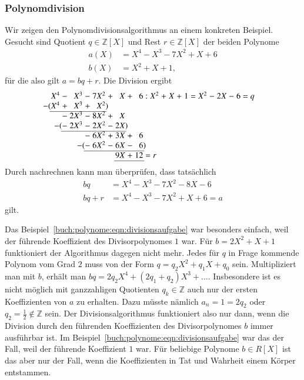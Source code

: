 \subsubsection{Polynomdivision}
Wir zeigen den Polynomdivisionsalgorithmus an einem konkreten Beispiel.
Gesucht sind Quotient $q\in \mathbb{Z}[X]$ und Rest $r\in\mathbb{Z}[X]$
der beiden Polynome
\begin{equation}
\begin{aligned}
a(X) &= X^4 - X^3 -7X^2 + X + 6\\
b(X) &= X^2+X+1,
\end{aligned}
\label{buch:polynome:eqn:divisionsaufgabe}
\end{equation}
für die also gilt $a=bq+r$.
Die Division ergibt
\[
\arraycolsep=1.4pt
\begin{array}{rcrcrcrcrcrcrcrcrcrcr}
X^4&-& X^3&-&7X^2&+& X&+&6&:&X^2&+&X&+&1&=&X^2&-&2X&-&6=q\\
\llap{$-($}X^4&+& X^3&+& X^2\rlap{$)$}& &  & & & &   & & & & & &   & &  & & \\ \cline{1-5}
   &-&2X^3&-&8X^2&+& X& & & &   & & & & & &   & &  & & \\
   &\llap{$-($}-&2X^3&-&2X^2&-&2X\rlap{$)$}& & & &   & & & & & &   & &  & & \\ \cline{2-7}
   & &    &-&6X^2&+&3X&+&6& &   & & & & & &   & &  & & \\
   & &    &\llap{$-($}-&6X^2&-&6X&-&6\rlap{$)$}& &   & & & & & &   & &  & & \\ \cline{4-9}
   & &    & &    & &9X&+&12\rlap{$\mathstrut=r$}& &   & & & & & &   & &  & & \\ \cline{7-9}
\end{array}
\]
Durch nachrechnen kann man überprüfen, dass tatsächlich
\begin{align*}
bq
&=
X^4-X^3-7X^2-8X-6
\\
bq+r&=
X^4-X^3-7X^2+X+6 = a
\end{align*}
gilt.

Das Beispiel~\eqref{buch:polynome:eqn:divisionsaufgabe} war besonders
einfach, weil der führende Koeffizient des Divisorpolynomes $1$ war.
Für $b=2X^2+X+1$ funktioniert der Algorithmus dagegen nicht mehr.
Jedes für $q$ in Frage kommende Polynom vom Grad $2$ muss von der
Form $q=q_2X^2+q_1X+q_0$ sein.
Multipliziert man mit $b$, erhält man $bq=2q_2X^4 + (2q_1+q_2)X^3+\dots$.
Insbesondere ist es nicht möglich mit ganzzahligen Quotienten
$q_k\in\mathbb{Z}$ auch nur der ersten Koeffizienten von $a$ zu
erhalten.
Dazu müsste nämlich $a_n = 1 = 2q_2$ oder $q_2 = \frac12\not\in\mathbb{Z}$
sein.
Der Divisionsalgorithmus funktioniert also nur dann, wenn die 
Division durch den führenden Koeffizienten des Divisorpolynomes $b$ 
immer ausführbar ist.
Im Beispiel~\eqref{buch:polynome:eqn:divisionsaufgabe} war das der
Fall, weil der führende Koeffizient $1$ war.
Für beliebige Polynome $b\in R[X]$ ist das aber nur der Fall,
wenn die Koeffizienten in Tat und Wahrheit einem Körper entstammen.


